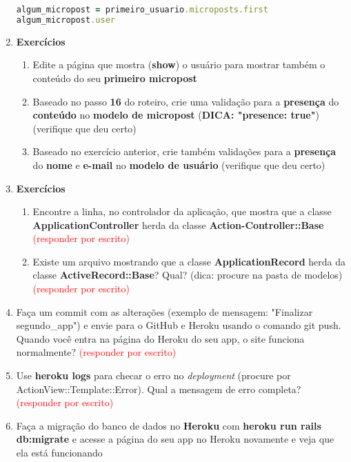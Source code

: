\documentclass[a4paper,12pt]{article}
\begin{document}
\begin{enumerate}
  \begin{lstlisting}[language=Ruby, title=app/models/micropost.rb]
algum_micropost = primeiro_usuario.microposts.first
algum_micropost.user
  \end{lstlisting}

  \item \textbf{Exercícios}

    \begin{enumerate}
      \item Edite a página que mostra (\textbf{show}) o usuário para mostrar também o conteúdo do seu \textbf{primeiro micropost}
      \item Baseado no passo \textbf{16} do roteiro, crie uma validação para a \textbf{presença} do \textbf{conteúdo} no \textbf{modelo de micropost} (\textbf{DICA: "presence: true"}) (verifique que deu certo)
      \item Baseado no exercício anterior, crie também validações para a \textbf{presença} do \textbf{nome} e \textbf{e-mail} no \textbf{modelo de usuário} (verifique que deu certo)
    \end{enumerate}

  \item \textbf{Exercícios}

    \begin{enumerate}
      \item Encontre a linha, no controlador da aplicação, que mostra que a classe \textbf{ApplicationController} herda da classe \textbf{Action-Controller::Base} \textcolor{red}{(responder por escrito)}
      \item Existe um arquivo mostrando que a classe \textbf{ApplicationRecord} herda da classe \textbf{ActiveRecord::Base}? Qual? (dica: procure na pasta de modelos) \textcolor{red}{(responder por escrito)}
    \end{enumerate}

  \item Faça um commit com as alterações (exemplo de mensagem: "Finalizar segundo\_app") e envie para o GitHub e Heroku usando o comando git push. Quando você entra na página do Heroku do seu app, o site funciona normalmente? \textcolor{red}{(responder por escrito)}

  \item Use \textbf{heroku logs} para checar o erro no \textit{deployment} (procure por ActionView::Template::Error). Qual a mensagem de erro completa? \textcolor{red}{(responder por escrito)}

  \item Faça a migração do banco de dados no \textbf{Heroku} com \textbf{heroku run rails db:migrate} e acesse a página do seu app no Heroku novamente e veja que ela está funcionando
\end{enumerate}
\end{document}
